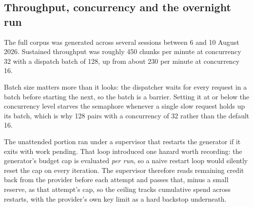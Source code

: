 \documentclass[10pt,a4paper]{article}
\newcommand{\codeid}[1]{\texttt{\footnotesize\color{inksoft}#1}}
\begin{document}
\begin{figure}[h]
\centering
{}
\end{figure}

\subsection{Throughput, concurrency and the overnight run}

The full corpus was generated across several sessions between 6 and 10 August
2026. Sustained throughput was roughly 450 chunks per minute at concurrency 32
with a dispatch batch of 128, up from about 230 per minute at concurrency 16.

Batch size matters more than it looks: the dispatcher waits for every request
in a batch before starting the next, so the batch is a barrier. Setting it at
or below the concurrency level starves the semaphore whenever a single slow
request holds up its batch, which is why 128 pairs with a concurrency of 32
rather than the default 16.

The unattended portion ran under a supervisor that restarts the generator if it
exits with work pending. That loop introduced one hazard worth recording: the
generator's budget cap is evaluated \emph{per run}, so a naive restart loop
would silently reset the cap on every iteration. The supervisor therefore reads
remaining credit back from the provider before each attempt and passes that,
minus a small reserve, as that attempt's cap, so the ceiling tracks
cumulative spend across restarts, with the provider's own key limit as a hard
backstop underneath.
\end{document}
